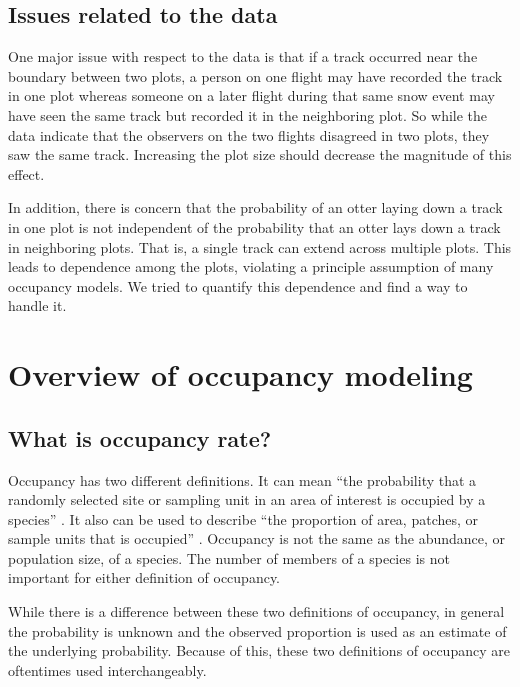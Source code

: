 \documentclass[12pt]{article}
\begin{document}
    \subsection{Issues related to the data}
    One major issue with respect to the data is that if a track occurred near
    the boundary between two plots, a person on one flight may have recorded the
    track in one plot whereas someone on a later flight during that same snow
    event may have seen the same track but recorded it in the neighboring plot.
    So while the data indicate that the observers on the two flights disagreed
    in two plots, they saw the same track. Increasing the plot size should
    decrease the magnitude of this effect.

    In addition, there is concern that the probability of an otter laying down a
    track in one plot is not independent of the probability that an otter lays
    down a track in neighboring plots. That is, a single track can extend across 
    multiple plots. This leads to dependence among the plots, violating a 
    principle assumption of many
    occupancy models. We tried to quantify this
    dependence and find a way to handle it.

\section{Overview of occupancy modeling}

    \subsection{What is occupancy rate?}
    Occupancy has two different definitions. It can mean ``the probability that
    a randomly selected site or sampling unit in an area of interest is occupied
    by a species'' \cite{MacKenzie2006}. It also can be used to describe ``the
    proportion of area, patches, or sample units that is occupied''
    \cite{MacKenzie2006}. Occupancy is not the same as the abundance, or
    population size, of a species. The number of members of a species is not
    important for either definition of occupancy.

    While there is a difference between these two definitions of occupancy, in
    general the probability is unknown and the observed proportion is used as an
    estimate of the underlying probability. Because of this, these two
    definitions of occupancy are oftentimes used interchangeably.
\end{document}
